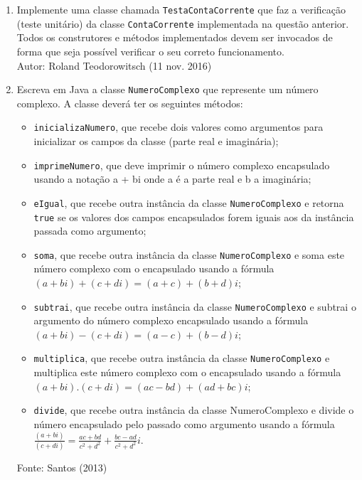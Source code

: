 \documentclass[onecolumn,a4paper,10pt]{report}
\newcommand{\+}{\, + \,}
\newcommand{\<}{\hspace*{-0.4cm}}
\begin{document}
\begin{enumerate}
\item Implemente uma classe chamada \texttt{TestaContaCorrente} que faz a verificação (teste unitário) da classe \texttt{ContaCorrente} implementada na questão anterior. Todos os construtores e métodos implementados devem ser invocados de forma que seja possível verificar o seu correto funcionamento.\\
{\tiny Autor: Roland Teodorowitsch (11 nov. 2016)}

\item Escreva em Java a classe \texttt{NumeroComplexo} que represente um número complexo. A classe deverá ter os seguintes métodos:
\begin{itemize}
	\item \texttt{inicializaNumero}, que recebe dois valores como argumentos para inicializar os campos da classe (parte real e imaginária);
	\item \texttt{imprimeNumero}, que deve imprimir o número complexo encapsulado usando a notação a + bi onde a é a parte real e b a imaginária;
	\item \texttt{eIgual}, que recebe outra instância da classe \texttt{NumeroComplexo} e retorna \texttt{true} se os valores dos campos encapsulados forem iguais aos da instância passada como argumento;
	\item \texttt{soma}, que recebe outra instância da classe \texttt{NumeroComplexo} e soma este número complexo com o encapsulado usando a fórmula $(a + bi) + (c + di) = (a + c) + (b + d)i$;
	\item \texttt{subtrai}, que recebe outra instância da classe \texttt{NumeroComplexo} e subtrai o argumento do número complexo encapsulado usando a fórmula $(a + bi) - (c + di) = (a - c) + (b - d)i$;
	\item \texttt{multiplica}, que recebe outra instância da classe \texttt{NumeroComplexo} e multiplica este número complexo com o encapsulado usando a fórmula $(a + bi) . (c + di) = (ac - bd) + (ad + bc)i$;
	\item \texttt{divide}, que recebe outra instância da classe NumeroComplexo e divide o número encapsulado pelo passado como argumento usando a fórmula $\frac{(a+bi)}{(c+di)} = \frac{ac+bd}{c^2+d^2} + \frac{bc-ad}{c^2+d^2}i$.
\end{itemize}
{\tiny Fonte: Santos (2013)}


\begin{comment}


\end{comment}
\end{enumerate}
\end{document}
